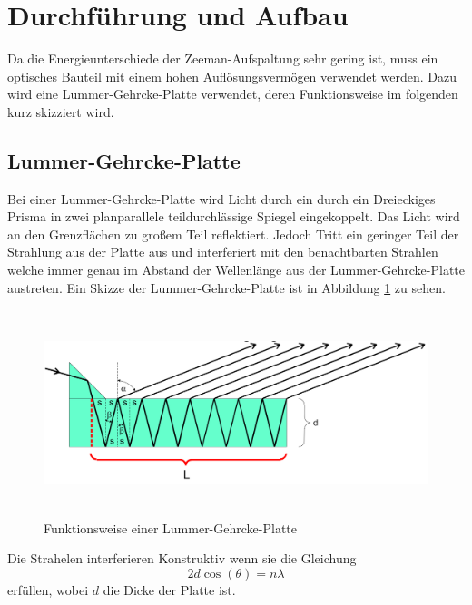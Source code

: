 \section{Durchführung und Aufbau}
\label{sec:Durchführung}

Da die Energieunterschiede der Zeeman-Aufspaltung sehr gering ist, muss ein optisches Bauteil mit einem hohen Auflösungsvermögen verwendet werden. Dazu wird eine Lummer-Gehrcke-Platte verwendet, deren Funktionsweise im folgenden kurz skizziert wird. 
\subsection{Lummer-Gehrcke-Platte}
Bei einer Lummer-Gehrcke-Platte wird Licht durch ein durch ein Dreieckiges Prisma in zwei planparallele teildurchlässige Spiegel eingekoppelt. Das Licht wird an den Grenzflächen zu großem Teil reflektiert. Jedoch Tritt ein geringer Teil der Strahlung aus der Platte aus und interferiert mit den benachtbarten Strahlen welche immer genau im Abstand der Wellenlänge aus der Lummer-Gehrcke-Platte austreten. Ein Skizze der Lummer-Gehrcke-Platte ist in Abbildung \ref{fig:Lum} zu sehen.

\begin{figure}[H]
  \centering
  \includegraphics[height=6cm]{Bilder/Lummer.png}
  \caption{Funktionsweise einer Lummer-Gehrcke-Platte}
  \label{fig:Lum}
\end{figure}

Die Strahelen interferieren Konstruktiv wenn sie die Gleichung 
\begin{equation}
  2 d \cos(\theta) = n \lambda
  \label{}
\end{equation}
erfüllen, wobei $d$ die Dicke der Platte ist.

